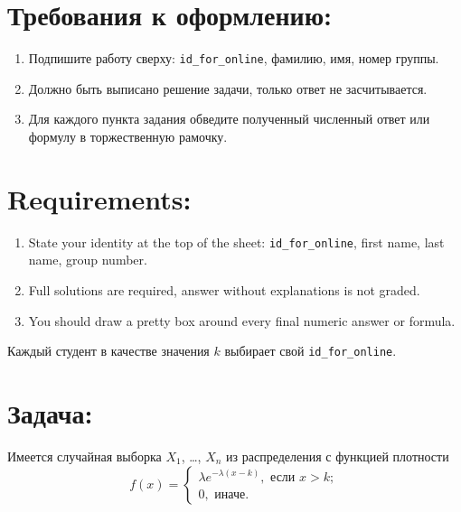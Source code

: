 \documentclass[12pt]{article}
\begin{document}
\section*{Требования к оформлению:}

\begin{enumerate}
\item Подпишите работу сверху: \verb|id_for_online|, фамилию, имя, номер группы.
\item Должно быть выписано решение задачи, только ответ не засчитывается.
\item Для каждого пункта задания обведите полученный численный ответ или формулу в торжественную рамочку.
\end{enumerate}

\section*{Requirements:}

\begin{enumerate}
\item State your identity at the top of the sheet: \verb|id_for_online|, first name, last name, group number.
\item Full solutions are required, answer without explanations is not graded. 
\item You should draw a pretty box around every final numeric answer or formula.
\end{enumerate}



\newpage

Каждый студент в качестве значения $k$ выбирает свой \verb|id_for_online|.


\section*{Задача:}

Имеется случайная выборка $X_1$, \ldots, $X_n$ из распределения с функцией плотности
\[
f(x) = \begin{cases}
  \lambda e^{-\lambda(x-k)}, \text{ если } x > k; \\
  0, \text{ иначе.}  
\end{cases}
\]
  
\end{document}
